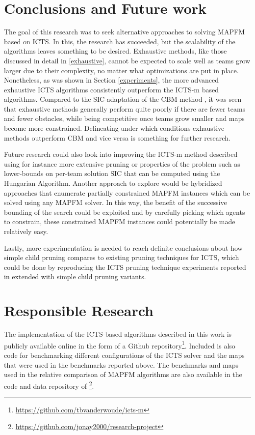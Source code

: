 \documentclass[english,10pt]{article}
\begin{document}
	\section{Conclusions and Future work}
	\label{conclusions}
	\label{future}
	The goal of this research was to seek alternative approaches to solving MAPFM based on ICTS. In this, the research has succeeded, but the scalability of the algorithms leaves something to be desired. Exhaustive methods, like those discussed in detail in \ref{exhaustive}, cannot be expected to scale well as teams grow larger due to their complexity, no matter what optimizations are put in place. Nonetheless, as was shown in Section \ref{experiments}, the more advanced exhaustive ICTS algorithms consistently outperform the ICTS-m based algorithms. Compared to the SIC-adaptation of the CBM method \cite{baauw2021}, it was seen that exhaustive methods generally perform quite poorly if there are fewer teams and fewer obstacles, while being competitive once teams grow smaller and maps become more constrained. Delineating under which conditions exhaustive methods outperform CBM and vice versa is something for further research.
	
	Future research could also look into improving the ICTS-m method described using for instance more extensive pruning or properties of the problem such as lower-bounds on per-team solution SIC that can be computed using the Hungarian Algorithm. Another approach to explore would be hybridized approaches that enumerate partially constrained MAPFM instances which can be solved using any MAPFM solver. In this way, the benefit of the successive bounding of the search could be exploited and by carefully picking which agents to constrain, these constrained MAPFM instances could potentially be made relatively easy.
	
	Lastly, more experimentation is needed to reach definite conclusions about how simple child pruning compares to existing pruning techniques for ICTS, which could be done by reproducing the ICTS pruning technique experiments reported in \cite{sharon2011} extended with simple child pruning variants. %
	
	\section{Responsible Research}
	The implementation of the ICTS-based algorithms described in this work is publicly available online in the form of a Github repository\footnote{\url{https://github.com/tbvanderwoude/icts-m}}. Included is also code for benchmarking different configurations of the ICTS solver and the maps that were used in the benchmarks reported above. The benchmarks and maps used in the relative comparison of MAPFM algorithms are also available in the code and data repository of \cite{donszelmann2021}\footnote{\url{https://github.com/jonay2000/research-project}}.
	
\end{document}
